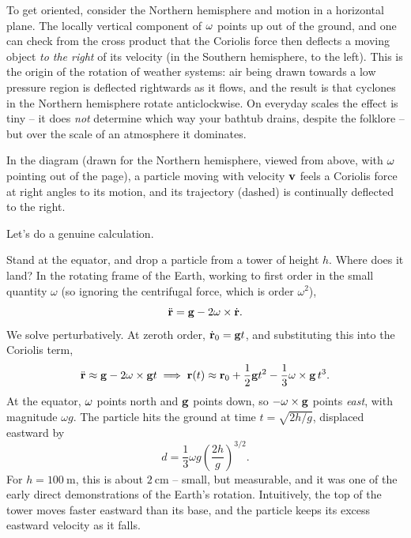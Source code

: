 \documentclass[a4paper]{scrartcl}
\begin{document}
To get oriented, consider the Northern hemisphere and motion in a horizontal plane. The locally vertical component of $\mathbf{\omega}$ points up out of the ground, and one can check from the cross product that the Coriolis force then deflects a moving object \emph{to the right} of its velocity (in the Southern hemisphere, to the left). This is the origin of the rotation of weather systems: air being drawn towards a low pressure region is deflected rightwards as it flows, and the result is that cyclones in the Northern hemisphere rotate anticlockwise. On everyday scales the effect is tiny -- it does \emph{not} determine which way your bathtub drains, despite the folklore -- but over the scale of an atmosphere it dominates.

\begin{center}
\end{center}

In the diagram (drawn for the Northern hemisphere, viewed from above, with $\mathbf{\omega}$ pointing out of the page), a particle moving with velocity $\mathbf{v}$ feels a Coriolis force at right angles to its motion, and its trajectory (dashed) is continually deflected to the right.

Let's do a genuine calculation.

\begin{example}
	Stand at the equator, and drop a particle from a tower of height $h$. Where does it land? In the rotating frame of the Earth, working to first order in the small quantity $\omega$ (so ignoring the centrifugal force, which is order $\omega^2$),
	$$
	\ddot{\mathbf{r}} = \mathbf{g} - 2 \mathbf{\omega} \times \dot{\mathbf{r}}.
	$$
	We solve perturbatively. At zeroth order, $\dot{\mathbf{r}}_0 = \mathbf{g} t$, and substituting this into the Coriolis term,
	$$
	\ddot{\mathbf{r}} \approx \mathbf{g} - 2 \mathbf{\omega} \times \mathbf{g} t \implies \mathbf{r}(t) \approx \mathbf{r}_0 + \frac{1}{2}\mathbf{g} t^2 - \frac{1}{3} \mathbf{\omega} \times \mathbf{g} \, t^3.
	$$
	At the equator, $\mathbf{\omega}$ points north and $\mathbf{g}$ points down, so $-\mathbf{\omega} \times \mathbf{g}$ points \emph{east}, with magnitude $\omega g$. The particle hits the ground at time $t = \sqrt{2h/g}$, displaced eastward by
	$$
	d = \frac{1}{3}\omega g \left(\frac{2h}{g}\right)^{3/2}.
	$$
	For $h = \SI{100}{\meter}$, this is about $\SI{2}{\centi\meter}$ -- small, but measurable, and it was one of the early direct demonstrations of the Earth's rotation. Intuitively, the top of the tower moves faster eastward than its base, and the particle keeps its excess eastward velocity as it falls.
\end{example}
\end{document}
